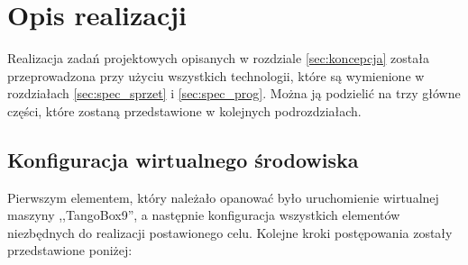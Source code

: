 \clearpage
\section{Opis realizacji}
\label{sec:opis_realizacji}

\quad Realizacja zadań projektowych opisanych w rozdziale \ref{sec:koncepcja} została przeprowadzona przy użyciu wszystkich technologii, które są wymienione w rozdziałach \ref{sec:spec_sprzet} i \ref{sec:spec_prog}. Można ją podzielić na trzy główne części, które zostaną przedstawione w kolejnych podrozdziałach.

\subsection{Konfiguracja wirtualnego środowiska}
\label{sub:konfiguracja}
\quad Pierwszym elementem, który należało opanować było uruchomienie wirtualnej maszyny ,,TangoBox9'', a następnie konfiguracja wszystkich elementów niezbędnych do realizacji postawionego celu. Kolejne kroki postępowania zostały przedstawione poniżej:


